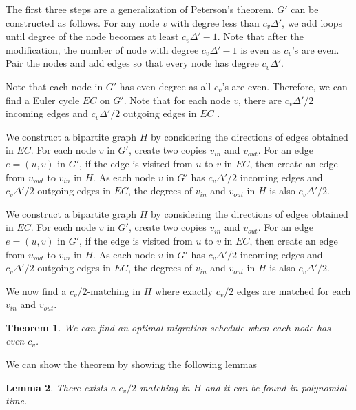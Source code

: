 \documentclass[titlepage, 11pt]{article}
\newtheorem{theorem}{Theorem}
\newtheorem{lemma}[theorem]{Lemma}
\begin{document}
\vspace{0.1in}
The first three steps  are a generalization of
Peterson's theorem. $G'$ can be constructed as follows.
For any node $v$ with degree less than $c_v \Delta'$, we add
loops until degree of the node becomes at least $c_v \Delta' - 1$.
Note that after the modification, the number of node with degree 
$c_v \Delta' - 1$ is even as $c_v$'s are even. Pair the nodes and add edges 
so that every node has degree $c_v \Delta'$.

Note that each node in $G'$ has even degree  as all $c_v$'s are even. 
Therefore, we can find a Euler cycle $EC$ on $G'$.
Note that  for each node $v$, there are $c_v \Delta'/2$ incoming edges
and $c_v \Delta'/2$ outgoing edges in $EC$ .

We construct a bipartite graph $H$ by considering the directions of edges
obtained in $EC$. For each node $v$ in $G'$, create two copies $v_{in}$
and $v_{out}$. For an edge $e = (u, v)$ in $G'$, if the edge is visited
from $u$ to $v$ in $EC$, then create an edge from $u_{out}$ to $v_{in}$ in $H$.
As each node $v$ in $G'$ has $c_v \Delta'/2$ incoming edges and
$c_v \Delta'/2$ outgoing edges in $EC$, the degrees of $v_{in}$ and
$v_{out}$  in $H$ is also $c_v \Delta'/2$.

We construct a bipartite graph $H$ by considering the directions of edges
obtained in $EC$. For each node $v$ in $G'$, create two copies $v_{in}$
and $v_{out}$. For an edge $e = (u, v)$ in $G'$, if the edge is visited
from $u$ to $v$ in $EC$, then create an edge from $u_{out}$ to $v_{in}$ in $H$.
As each node $v$ in $G'$ has $c_v \Delta'/2$ incoming edges and
$c_v \Delta'/2$ outgoing edges in $EC$, the degrees of $v_{in}$ and
$v_{out}$  in $H$ is also $c_v \Delta'/2$.

\vspace{0.1in}
We now find a $c_v/2$-matching in $H$  where exactly $c_v/2$ edges are matched for each $v_{in}$
and $v_{out}$. 

\begin{theorem}
We can find an optimal migration schedule when each node has even $c_v$.
\end{theorem}

We can show the theorem by showing the following lemmas 

\begin{lemma}
There exists  a $c_v/2$-matching in $H$ and it can be found in polynomial time.
\end{lemma}
\end{document}
